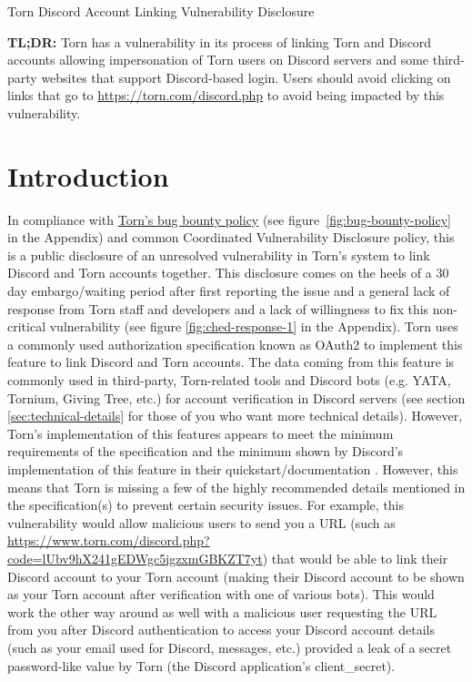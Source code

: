 \documentclass{article}
\begin{document}
\begin{center}
	\begin{large}
		Torn Discord Account Linking Vulnerability Disclosure
	\end{large}
\end{center}

\raggedright

\par{\textbf{TL;DR:} Torn has a vulnerability in its process of linking Torn and Discord accounts allowing impersonation of Torn users on Discord servers and some third-party websites that support Discord-based login. Users should avoid clicking on links that go to \url{https://torn.com/discord.php} to avoid being impacted by this vulnerability.

\tableofcontents

\section{Introduction} \label{sec:introduction}
\par{In compliance with \href{https://www.torn.com/forums.php#/p=threads&f=1&t=16141356&b=0&a=0}{Torn's bug bounty policy} (see figure~\ref{fig:bug-bounty-policy} in the Appendix) and common Coordinated Vulnerability Disclosure policy, this is a public disclosure of an unresolved vulnerability in Torn's system to link Discord and Torn accounts together. This disclosure comes on the heels of a 30 day embargo/waiting period after first reporting the issue and a general lack of response from Torn staff and developers and a lack of willingness to fix this non-critical vulnerability (see figure \ref{fig:ched-response-1} in the Appendix). Torn uses a commonly used authorization specification known as OAuth2 to implement this feature to link Discord and Torn accounts. The data coming from this feature is commonly used in third-party, Torn-related tools and Discord bots (e.g. YATA, Tornium, Giving Tree, etc.) for account verification in Discord servers (see section \ref{sec:technical-details} for those of you who want more technical details). However, Torn's implementation of this features appears to meet the minimum requirements of the specification and the minimum shown by Discord's implementation of this feature in their quickstart/documentation \cite{discord-oauth-authorization-flow}. However, this means that Torn is missing a few of the highly recommended details mentioned in the specification(s) to prevent certain security issues. For example, this vulnerability would allow malicious users to send you a URL (such as \url{https://www.torn.com/discord.php?code=lUbv9hX241gEDWgc5igzxmGBKZT7yt}) that would be able to link their Discord account to your Torn account (making their Discord account to be shown as your Torn account after verification with one of various bots). This would work the other way around as well with a malicious user requesting the URL from you after Discord authentication to access your Discord account details (such as your email used for Discord, messages, etc.) provided a leak of a secret password-like value by Torn (the Discord application's client\_secret).}

}
\end{document}
